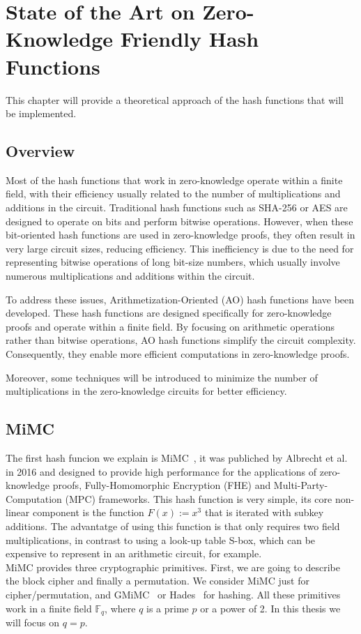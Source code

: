 \chapter{State of the Art on Zero-Knowledge Friendly Hash Functions}
\label{sec:zk-hashes}
This chapter will provide a theoretical approach of the hash functions that will be implemented.

\section*{Overview}
Most of the hash functions that work in zero-knowledge operate within a finite field, with their efficiency usually related to the number of multiplications and additions in the circuit.
Traditional hash functions such as SHA-256 or AES are designed to operate on bits and perform bitwise operations. However, when these bit-oriented hash functions are used in zero-knowledge proofs, they often result in very large circuit sizes, reducing efficiency. This inefficiency is due to the need for representing bitwise operations of long bit-size numbers, which usually involve numerous multiplications and additions within the circuit.

To address these issues, Arithmetization-Oriented (AO) hash functions have been developed. These hash functions are designed specifically for zero-knowledge proofs and operate within a finite field. By focusing on arithmetic operations rather than bitwise operations, AO hash functions simplify the circuit complexity. Consequently, they enable more efficient computations in zero-knowledge proofs.

Moreover, some techniques will be introduced to minimize the number of multiplications in the zero-knowledge circuits for better efficiency.


\section{MiMC}
The first hash funcion we explain is MiMC~\cite{albrecht2016mimc}, it was publiched by Albrecht et al. in 2016 and designed to provide high performance for the applications of zero-knowledge proofs, Fully-Homomorphic Encryption (FHE) and Multi-Party-Computation (MPC) frameworks. This hash function is very simple, its core non-linear component is the function $F(x) := x^3$ that is iterated with subkey additions. The advantatge of using this function is that only requires two field multiplications, in contrast to using a look-up table S-box, which can be expensive to represent in an arithmetic circuit, for example.\\
MiMC provides three cryptographic primitives. First, we are going to describe the block cipher and finally a permutation. We consider MiMC just for cipher/permutation, and GMiMC~\cite{cryptoeprint:2019/397} or Hades~\cite{10.1007/978-3-030-45724-2_23} for hashing. All these primitives work in a finite field $\mathbb{F}_q$, where $q$ is a prime $p$ or a power of 2. In this thesis we will focus on $q=p$.

